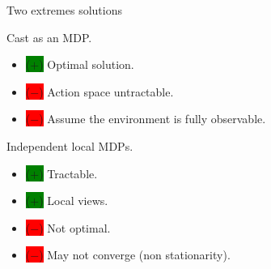 \documentclass{beamer}
\newcommand{\cplus}{\colorbox{green}{($+$)} }
\newcommand{\cmoins}{\colorbox{red}{($-$)} }
\begin{document}
    \begin{frame}{Two extremes solutions}
        \pause
        \begin{block}{Cast as an MDP.}
            \begin{itemize}
                \item[] \cplus Optimal solution.
                \item[] \cmoins Action space untractable.
                \item[] \cmoins Assume the environment is fully observable.
            \end{itemize}
        \end{block}
        \pause
        \begin{block}{Independent local MDPs.}
            \begin{itemize}
                \item[] \cplus Tractable.
                \item[] \cplus Local views.
                \item[] \cmoins Not optimal.
                \item[] \cmoins May not converge (non stationarity).
            \end{itemize}
        \end{block}
    \end{frame}
\end{document}
